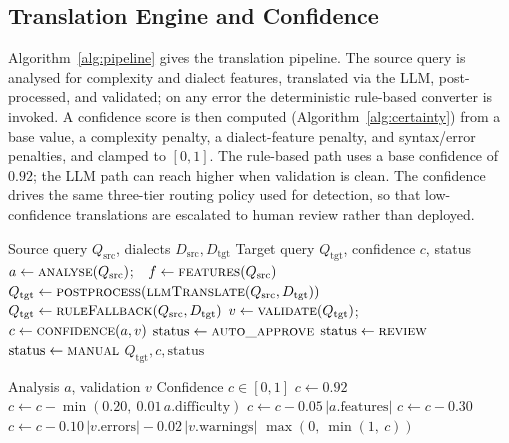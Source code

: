 \documentclass{ieeeaccess}
\begin{document}
\subsection{Translation Engine and Confidence}
Algorithm~\ref{alg:pipeline} gives the translation pipeline. The source query is analysed for complexity and dialect
features, translated via the LLM, post-processed, and validated; on any error the deterministic rule-based converter is
invoked. A confidence score is then computed (Algorithm~\ref{alg:certainty}) from a base value, a complexity penalty, a
dialect-feature penalty, and syntax/error penalties, and clamped to $[0,1]$. The rule-based path uses a base confidence of
$0.92$; the LLM path can reach higher when validation is clean. The confidence drives the same three-tier routing policy
used for detection, so that low-confidence translations are escalated to human review rather than deployed.

\begin{algorithm}[tbp]
\caption{Confidence-Aware Translation with Fallback}
\label{alg:pipeline}
\begin{algorithmic}[1]
\Require Source query $Q_{\mathrm{src}}$, dialects $D_{\mathrm{src}}, D_{\mathrm{tgt}}$
\Ensure Target query $Q_{\mathrm{tgt}}$, confidence $c$, status
\State $a \gets \textsc{analyse}(Q_{\mathrm{src}})$;\ \ $f \gets \textsc{features}(Q_{\mathrm{src}})$
\State $Q_{\mathrm{tgt}} \gets \textsc{postprocess}(\textsc{llmTranslate}(Q_{\mathrm{src}}, D_{\mathrm{tgt}}))$
 \State $Q_{\mathrm{tgt}} \gets \textsc{ruleFallback}(Q_{\mathrm{src}}, D_{\mathrm{tgt}})$ \EndIf
\State $v \gets \textsc{validate}(Q_{\mathrm{tgt}})$;\ \ $c \gets \textsc{confidence}(a, v)$
 \State $\mathrm{status} \gets \textsc{auto\_approve}$
 \State $\mathrm{status} \gets \textsc{review}$
\Else \State $\mathrm{status} \gets \textsc{manual}$ \EndIf
\State \Return $Q_{\mathrm{tgt}}, c, \mathrm{status}$
\end{algorithmic}
\end{algorithm}

\begin{algorithm}[tbp]
\caption{Translation Confidence Estimation}
\label{alg:certainty}
\begin{algorithmic}[1]
\Require Analysis $a$, validation $v$
\Ensure Confidence $c \in [0,1]$
\State $c \gets 0.92$
\State $c \gets c - \min(0.20,\ 0.01\,a.\mathrm{difficulty})$
\State $c \gets c - 0.05\,|a.\mathrm{features}|$
 \State $c \gets c - 0.30$ \EndIf
\State $c \gets c - 0.10\,|v.\mathrm{errors}| - 0.02\,|v.\mathrm{warnings}|$
\State \Return $\max(0,\ \min(1,\ c))$
\end{algorithmic}
\end{algorithm}
\end{document}
